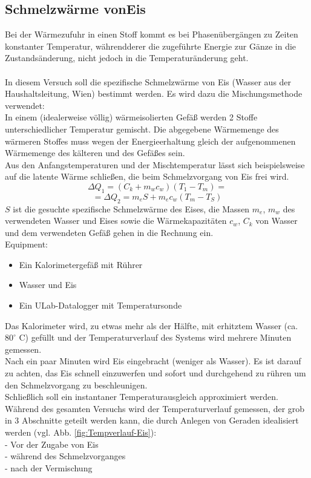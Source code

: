 \documentclass[12pt,a4paper]{article}
\begin{document}
\begin{multicols}{2}

\section{Schmelzwärme vonEis}
Bei der Wärmezufuhr in einen Stoff kommt es bei Phasenübergängen zu Zeiten konstanter Temperatur, währendderer die zugeführte Energie zur Gänze in die Zustandsänderung, nicht jedoch in die Temperaturänderung geht.\\
\\
In diesem Versuch soll die spezifische Schmelzwärme von Eis (Wasser aus der Haushaltsleitung, Wien) bestimmt werden. Es wird dazu die Mischungsmethode verwendet:\\
In einem (idealerweise völlig) wärmeisolierten Gefäß werden 2 Stoffe unterschiedlicher Temperatur gemischt. Die abgegebene Wärmemenge des wärmeren Stoffes muss wegen der Energieerhaltung gleich der aufgenommenen Wärmemenge des kälteren und des Gefäßes sein.\\
Aus den Anfangstemperaturen und der Mischtemperatur lässt sich beispielsweise auf die latente Wärme schließen, die beim Schmelzvorgang von Eis frei wird.
$$\Delta Q_1=(C_k+m_wc_w)(T_1-T_m)=$$
$$=\Delta Q_2 = m_eS+m_ec_w(T_m-T_S)$$
$S$ ist die gesuchte spezifische Schmelzwärme des Eises, die Massen $m_e$, $m_w$ des verwendeten Wasser und Eises sowie die Wärmekapazitäten $c_w$, $C_k$ von Wasser und dem verwendeten Gefäß gehen in die Rechnung ein.\\


\noindent Equipment:
\begin {itemize}
	\item Ein Kalorimetergefäß mit Rührer
	\item Wasser und Eis
	\item Ein ULab-Datalogger mit Temperatursonde
\end {itemize}

Das Kalorimeter wird, zu etwas mehr als der Hälfte, mit erhitztem Wasser (ca. $80^{\circ}$ C) gefüllt und der Temperaturverlauf des Systems wird mehrere Minuten gemessen.\\
Nach ein paar Minuten wird Eis eingebracht (weniger als Wasser). Es ist darauf zu achten, das Eis schnell einzuwerfen und sofort und durchgehend zu rühren um den Schmelzvorgang zu beschleunigen.\\
Schließlich soll ein instantaner Temperaturausgleich approximiert werden.\\
Während des gesamten Versuchs wird der Temperaturverlauf gemessen, der grob in 3 Abschnitte geteilt werden kann, die durch Anlegen von Geraden idealisiert werden (vgl. Abb. \ref{fig:Tempverlauf-Eis}):\\
- Vor der Zugabe von Eis\\
- während des Schmelzvorganges\\
- nach der Vermischung


\end{multicols}
\end{document}
